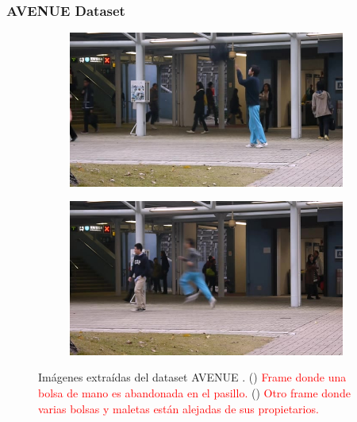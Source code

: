 \subsubsection{AVENUE Dataset}

\begin{figure}[ht]
  \centering
  \begin{subfigure}[b]{0.4\textwidth}
    \includegraphics[width=\textwidth]{img/chapters/resultados/bases-datos/avenue_1.jpg}
    \caption{}
    \label{fig:avenue_1}
  \end{subfigure}
  \qquad\qquad
  \begin{subfigure}[b]{0.4\textwidth}
    \includegraphics[width=\textwidth]{img/chapters/resultados/bases-datos/avenue_2.jpg}
    \caption{}
    \label{fig:avenue_2}
  \end{subfigure}
  \caption{Imágenes extraídas del dataset AVENUE \cite{avenue-dataset}.
    (\protect{}) \textcolor{red}{Frame donde una bolsa de mano es abandonada en el pasillo.}
    (\protect{}) \textcolor{red}{Otro frame donde varias bolsas y maletas están alejadas de sus propietarios.}}
  \label{fig:avenue}
\end{figure}

